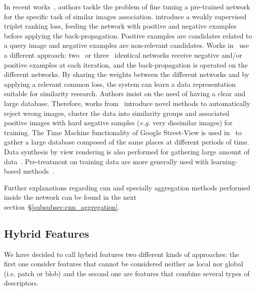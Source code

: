 			In recent works~\citep{Arandjelovic2017,Radenovic2016, Gordo2016}, authors tackle the problem of fine tuning a pre-trained network for the specific task of similar images association. \citet{Arandjelovic2017} introduce a weakly supervised triplet ranking loss, feeding the network with positive and negative examples before applying the back-propagation. Positive examples are candidates related to a query image and negative examples are non-relevant candidates. Works in~\citep{Radenovic2016, Gordo2016} use a different approach: two~\citep{Radenovic2016} or three~\citep{Gordo2016} identical networks receive negative and/or positive examples at each iteration, and the back-propagation is operated on the different networks. By sharing the weights between the different networks and by applying a relevant common loss, the system can learn a data representation suitable for similarity research.	Authors insist on the need of having a clear and large database. Therefore, works from~\citep{Radenovic2016, Gordo2016} introduce novel methods to automatically reject wrong images, cluster the data into similarity groups and associated positive images with hard negative samples (\textit{e.g.} very dissimilar images) for training. The Time Machine functionality of Google Street-View is used in~\citep{Arandjelovic2017} to gather a large database composed of the same places at different periods of time. Data synthesis by view rendering is also performed for gathering large amount of data~\citep{Jia2016,Sizikova2016}.  Pre-treatment on training data are more generally used with learning-based methods~\citep{Kim2015,Cao2013}. 
	
			Further explanations regarding \ac{cnn} and specially aggregation methods performed inside the network can be found in the next section~\S\ref{subsubsec:cnn_aggregation}.

	\subsection{Hybrid Features}
	\label{subsec:hybrid_feature}
		We have decided to call hybrid features two different kinds of approaches: the first one consider features that cannot be considered neither as local nor global (i.e. patch or blob) and the second one are features that combine several types of descriptors.
